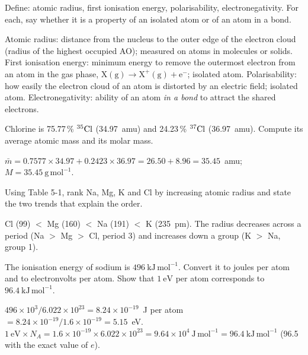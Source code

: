
Define: atomic radius, first ionisation energy, polarisability, electronegativity. For each, say
whether it is a property of an isolated atom or of an atom in a bond.
\begin{solution}
Atomic radius: distance from the nucleus to the outer edge of the electron cloud (radius of the highest
occupied AO); measured on atoms in molecules or solids.
First ionisation energy: minimum energy to remove the outermost electron from an atom in the gas phase,
$\mathrm X(\mathrm g)\to\mathrm X^+(\mathrm g)+\mathrm e^-$; isolated atom.
Polarisability: how easily the electron cloud of an atom is distorted by an electric field; isolated atom.
Electronegativity: ability of an atom \emph{in a bond} to attract the shared electrons.
\end{solution}

Chlorine is 75.77\,\% ${}^{35}\mathrm{Cl}$ (34.97~amu) and 24.23\,\% ${}^{37}\mathrm{Cl}$ (36.97~amu). Compute its
average atomic mass and its molar mass.
\begin{solution}
$\bar m = 0.7577\times34.97 + 0.2423\times36.97 = 26.50 + 8.96 = 35.45$~amu; $M = 35.45\ \mathrm{g\,mol^{-1}}$.
\end{solution}

Using Table 5-1, rank Na, Mg, K and Cl by increasing atomic radius and state the two trends that
explain the order.
\begin{solution}
Cl (99) $<$ Mg (160) $<$ Na (191) $<$ K (235~pm). The radius decreases across a period (Na $>$ Mg $>$ Cl,
period 3) and increases down a group (K $>$ Na, group 1).
\end{solution}

The ionisation energy of sodium is $496\ \mathrm{kJ\,mol^{-1}}$. Convert it to joules per atom and to
electronvolts per atom. Show that $1\ \mathrm{eV}$ per atom corresponds to $96.4\ \mathrm{kJ\,mol^{-1}}$.
\begin{solution}
$496\times10^3/6.022\times10^{23} = 8.24\times10^{-19}$~J per atom $= 8.24\times10^{-19}/1.6\times10^{-19}
= 5.15$~eV.\quad $1\ \mathrm{eV}\times N_A = 1.6\times10^{-19}\times6.022\times10^{23} = 9.64\times10^4\
\mathrm{J\,mol^{-1}} = 96.4\ \mathrm{kJ\,mol^{-1}}$ (96.5 with the exact value of $e$).
\end{solution}

